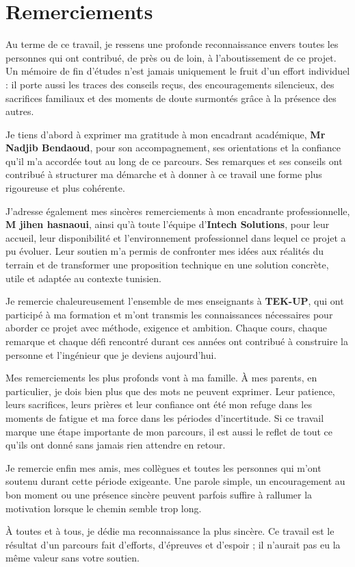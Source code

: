 
\clearpage
\thispagestyle{empty}
\chapter*{Remerciements}

Au terme de ce travail, je ressens une profonde reconnaissance envers toutes les
personnes qui ont contribué, de près ou de loin, à l'aboutissement de ce projet.
Un mémoire de fin d'études n'est jamais uniquement le fruit d'un effort
individuel : il porte aussi les traces des conseils reçus, des encouragements
silencieux, des sacrifices familiaux et des moments de doute surmontés grâce à
la présence des autres.

Je tiens d'abord à exprimer ma gratitude à mon encadrant académique,
\textbf{Mr Nadjib Bendaoud}, pour son accompagnement, ses orientations et la
confiance qu'il m'a accordée tout au long de ce parcours. Ses remarques et ses
conseils ont contribué à structurer ma démarche et à donner à ce travail une
forme plus rigoureuse et plus cohérente.

J'adresse également mes sincères remerciements à mon encadrante professionnelle,
\textbf{M jihen hasnaoui}, ainsi qu'à toute l'équipe d'\textbf{Intech Solutions},
pour leur accueil, leur disponibilité et l'environnement professionnel dans
lequel ce projet a pu évoluer. Leur soutien m'a permis de confronter mes idées
aux réalités du terrain et de transformer une proposition technique en une
solution concrète, utile et adaptée au contexte tunisien.

Je remercie chaleureusement l'ensemble de mes enseignants à \textbf{TEK-UP}, qui
ont participé à ma formation et m'ont transmis les connaissances nécessaires
pour aborder ce projet avec méthode, exigence et ambition. Chaque cours, chaque
remarque et chaque défi rencontré durant ces années ont contribué à construire
la personne et l'ingénieur que je deviens aujourd'hui.

Mes remerciements les plus profonds vont à ma famille. À mes parents, en
particulier, je dois bien plus que des mots ne peuvent exprimer. Leur patience,
leurs sacrifices, leurs prières et leur confiance ont été mon refuge dans les
moments de fatigue et ma force dans les périodes d'incertitude. Si ce travail
marque une étape importante de mon parcours, il est aussi le reflet de tout ce
qu'ils ont donné sans jamais rien attendre en retour.

Je remercie enfin mes amis, mes collègues et toutes les personnes qui m'ont
soutenu durant cette période exigeante. Une parole simple, un encouragement au
bon moment ou une présence sincère peuvent parfois suffire à rallumer la
motivation lorsque le chemin semble trop long.

À toutes et à tous, je dédie ma reconnaissance la plus sincère. Ce travail est
le résultat d'un parcours fait d'efforts, d'épreuves et d'espoir ; il n'aurait
pas eu la même valeur sans votre soutien.
